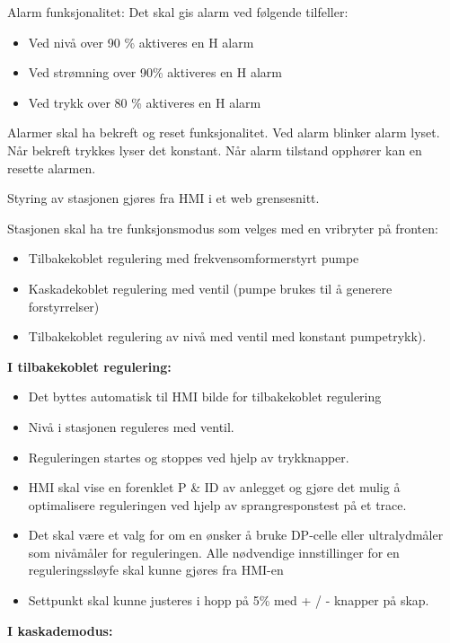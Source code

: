 \vskip 5pt 
Alarm funksjonalitet: 
\vskip 5pt 
Det skal gis alarm ved følgende tilfeller: 
\begin{itemize}[noitemsep]
\item Ved nivå over 90 \% aktiveres en H alarm
\item Ved strømning over 90\% aktiveres en H alarm 
\item Ved trykk over 80 \% aktiveres en H alarm 

\end{itemize}
\vskip 5pt 
Alarmer skal ha bekreft og reset funksjonalitet. Ved alarm blinker alarm lyset. Når bekreft trykkes lyser det konstant. Når alarm tilstand opphører kan en resette alarmen.  

\vskip 5pt 
Styring av stasjonen gjøres fra HMI i et web grensesnitt.

\vskip 5pt 
Stasjonen skal ha tre funksjonsmodus som velges med en vribryter på fronten:
\begin{itemize}[noitemsep]
	\item Tilbakekoblet regulering med frekvensomformerstyrt pumpe
	\item Kaskadekoblet regulering med ventil (pumpe brukes til å generere forstyrrelser)
	\item Tilbakekoblet regulering av nivå med ventil med konstant pumpetrykk). 
\end{itemize}

\vskip 5pt 
\vskip 5pt 
\textbf{I tilbakekoblet regulering:} 
\begin{itemize}[noitemsep]
	\item Det byttes automatisk til HMI bilde for tilbakekoblet regulering 
	\item Nivå i stasjonen reguleres med ventil.  
	\item Reguleringen startes og stoppes ved hjelp av trykknapper.   
	\item HMI skal vise en forenklet P \& ID av anlegget og gjøre det mulig å optimalisere reguleringen ved hjelp av sprangresponstest på et trace.  
	\item Det skal være et valg for om en ønsker å bruke DP-celle eller ultralydmåler som nivåmåler for reguleringen. Alle nødvendige innstillinger for en reguleringssløyfe skal kunne gjøres fra HMI-en 
	\item Settpunkt skal kunne justeres i hopp på 5\% med + / - knapper på skap.  

\end{itemize}


\textbf{I kaskademodus:}

